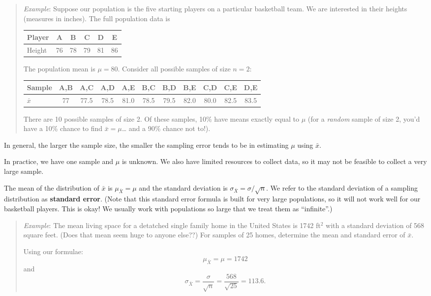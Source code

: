 \documentclass[
]{book}
\begin{document}
\begin{quote}
\emph{Example}: Suppose our population is the five starting players on a particular basketball team. We are interested in their heights (measures in inches). The full population data is

\begin{longtable}[]{@{}lccccc@{}}
\toprule
Player & A & B & C & D & E \\
\midrule
\endhead
Height & 76 & 78 & 79 & 81 & 86 \\
\bottomrule
\end{longtable}

The population mean is \(\mu=80\). Consider all possible samples of size \(n=2\):

\begin{longtable}[]{@{}lcccccccccc@{}}
\toprule
Sample & A,B & A,C & A,D & A,E & B,C & B,D & B,E & C,D & C,E & D,E \\
\midrule
\endhead
\(\bar{x}\) & 77 & 77.5 & 78.5 & 81.0 & 78.5 & 79.5 & 82.0 & 80.0 & 82.5 & 83.5 \\
\bottomrule
\end{longtable}

There are 10 possible samples of size 2. Of these samples, 10\% have means exactly equal to \(\mu\) (for a \emph{random} sample of size 2, you'd have a 10\% chance to find \(\bar{x}=\mu\)\ldots{} and a 90\% chance not to!).
\end{quote}

In general, the larger the sample size, the smaller the sampling error tends to be in estimating \(\mu\) using \(\bar{x}\).

In practice, we have one sample and \(\mu\) is unknown. We also have limited resources to collect data, so it may not be feasible to collect a very large sample.

The mean of the distribution of \(\bar{x}\) is \(\mu_{\bar{X}}=\mu\) and the standard deviation is \(\sigma_{\bar{X}}=\sigma/\sqrt{n}\). We refer to the standard deviation of a sampling distribution as \textbf{standard error}. (Note that this standard error formula is built for very large populations, so it will not work well for our basketball players. This is okay! We usually work with populations so large that we treat them as ``infinite''.)

\begin{quote}
\emph{Example}: The mean living space for a detatched single family home in the United States is 1742 ft\(^2\) with a standard deviation of 568 square feet. (Does that mean seem huge to anyone else??) For samples of 25 homes, determine the mean and standard error of \(\bar{x}\).

Using our formulae: \[\mu_{\bar{X}} = \mu = 1742\] and \[\sigma_{\bar{X}} = \frac{\sigma}{\sqrt{n}} = \frac{568}{\sqrt{25}} = 113.6.\]
\end{quote}
\end{document}
